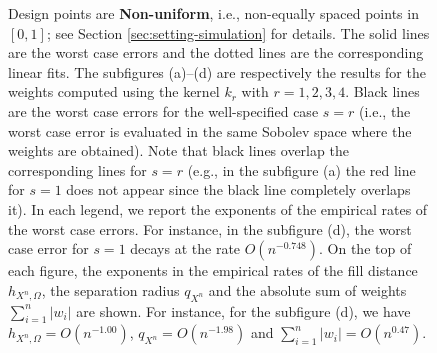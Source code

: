 \documentclass[11pt]{article}
\theoremstyle{remark}
\theoremstyle{example}
\theoremstyle{remark}
\begin{document}
\begin{figure}[th]
 \begin{center}
 \end{center}
\vspace{-4mm}
 \caption{
 Design points are \textbf{Non-uniform}, i.e., non-equally spaced points in $[0,1]$; see Section \ref{sec:setting-simulation} for details.
  The solid lines are the worst case errors and the dotted lines are the corresponding linear fits. 
   The subfigures (a)--(d) are respectively the results for the weights computed using the kernel $k_r$ with $r = 1, 2, 3, 4$.
   Black lines are the worst case errors for the well-specified case $s= r$ (i.e., the worst case error is evaluated in the same Sobolev space where the weights are obtained).
   Note that black lines overlap the corresponding lines for $s = r$ (e.g., in the subfigure (a) the red line for $s=1$ does not appear since the black line completely overlaps it).
   In each legend, we report the exponents of the empirical rates of the worst case errors.
 For instance, in the subfigure (d), the worst case error for $s = 1$ decays at the rate $O(n^{-0.748})$.
 On the top of each figure, the exponents in the empirical rates of the fill distance $h_{X^n,\Omega}$, the separation radius $q_{X^n}$ and the absolute sum of weights $\sum_{i=1}^n |w_i|$ are shown.
 For instance, for the subfigure (d), we have $h_{X^n,\Omega} = O(n^{-1.00})$, $q_{X^n} = O(n^{-1.98})$ and $\sum_{i=1}^n |w_i| = O(n^{0.47})$.
 }
 \label{fig:simulation-irreg}
\end{figure}
\vspace{-6mm}
\end{document}
